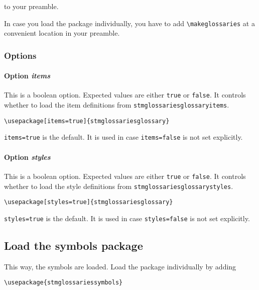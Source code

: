 \documentclass[%
  type=article,%
  layout=koma,%
  hyperref=true,%
  conditionallox=true,%
  conditionalloxnewpage=false,%
  date=true,%
  index=true,%
  listings=true%
]{stmtext}
\begin{document}
to your preamble.

In case you load the package individually, you have to add \texttt{\textbackslash makeglossaries} at a convenient location in your preamble.

\subsubsection{Options}

\paragraph{Option \protect\textit{items}}

This is a boolean option. Expected values are either \texttt{true} or \texttt{false}. It controls whether to load the item definitions from \texttt{stmglossariesglossaryitems}.

\begin{verbatim}
\usepackage[items=true]{stmglossariesglossary}
\end{verbatim}

\texttt{items=true} is the default. It is used in case \texttt{items=false} is not set explicitly.

\paragraph{Option \protect\textit{styles}}

This is a boolean option. Expected values are either \texttt{true} or \texttt{false}. It controls whether to load the style definitions from \texttt{stmglossariesglossarystyles}.

\begin{verbatim}
\usepackage[styles=true]{stmglossariesglossary}
\end{verbatim}

\texttt{styles=true} is the default. It is used in case \texttt{styles=false} is not set explicitly.

\subsection{Load the symbols package}
\label{sec:usage:preamble:symbolspackage}

This way, the symbols are loaded. Load the package individually by adding

\begin{verbatim}
\usepackage{stmglossariessymbols}
\end{verbatim}
\end{document}
